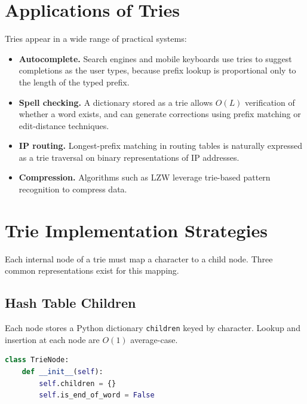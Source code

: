 \documentclass[11pt, a4paper, notitlepage]{report}
\theoremstyle{definition}
\theoremstyle{remark}
\theoremstyle{definition}
\begin{document}
\section{Applications of Tries}
\label{sec:trie-applications}

Tries appear in a wide range of practical systems:

\begin{itemize}
  \item \textbf{Autocomplete.} Search engines and mobile keyboards use tries
        to suggest completions as the user types, because prefix lookup is
        proportional only to the length of the typed prefix.
  \item \textbf{Spell checking.} A dictionary stored as a trie allows $O(L)$
        verification of whether a word exists, and can generate corrections
        using prefix matching or edit-distance techniques.
  \item \textbf{IP routing.} Longest-prefix matching in routing tables is
        naturally expressed as a trie traversal on binary representations of
        IP addresses.
  \item \textbf{Compression.} Algorithms such as LZW leverage trie-based
        pattern recognition to compress data.
\end{itemize}

\section{Trie Implementation Strategies}
\label{sec:trie-impl}

Each internal node of a trie must map a character to a child node.  Three
common representations exist for this mapping.

\subsection{Hash Table Children}
\label{subsec:trie-hash}

Each node stores a Python dictionary \texttt{children} keyed by character.
Lookup and insertion at each node are $O(1)$ average-case.

\begin{lstlisting}[language=Python]
class TrieNode:
    def __init__(self):
        self.children = {}
        self.is_end_of_word = False
\end{lstlisting}
\end{document}
